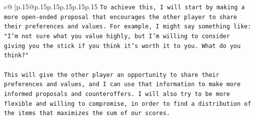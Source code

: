 \documentclass{article}
\begin{document}
{\begin{supertabular}{c@{$\;$}|p{.15\linewidth}@{}p{.15\linewidth}p{.15\linewidth}p{.15\linewidth}p{.15\linewidth}p{.15\linewidth}}
{{{\texttt{To achieve this, I will start by making a more open{-}ended proposal that encourages the other player to share their preferences and values. For example, I might say something like: "I'm not sure what you value highly, but I'm willing to consider giving you the stick if you think it's worth it to you. What do you think?"} \\
\\ 
\texttt{This will give the other player an opportunity to share their preferences and values, and I can use that information to make more informed proposals and counteroffers. I will also try to be more flexible and willing to compromise, in order to find a distribution of the items that maximizes the sum of our scores.} \\
            }
        }
    }
     \\ \\

\end{supertabular}
}
\end{document}
